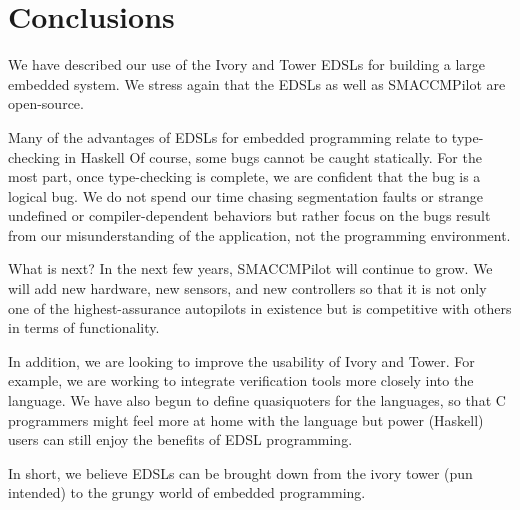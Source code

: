 \section{Conclusions}
\label{sec:conclusions}

We have described our use of the Ivory and Tower EDSLs for building a large
embedded system.  We stress again that the EDSLs as well as SMACCMPilot are
open-source.

Many of the advantages of EDSLs for embedded programming relate to type-checking
in Haskell Of course, some bugs cannot be caught statically.  For the most part,
once type-checking is complete, we are confident that the bug is a logical bug.
We do not spend our time chasing segmentation faults or strange undefined or
compiler-dependent behaviors but rather focus on the bugs result from our
misunderstanding of the application, not the programming environment.

What is next?  In the next few years, SMACCMPilot will continue to grow.  We
will add new hardware, new sensors, and new controllers so that it is not only
one of the highest-assurance autopilots in existence but is competitive with
others in terms of functionality.

In addition, we are looking to improve the usability of Ivory and Tower.  For
example, we are working to integrate verification tools more closely into the
language.  We have also begun to define quasiquoters for the languages, so that
C programmers might feel more at home with the language but power (Haskell)
users can still enjoy the benefits of EDSL programming.

In short, we believe EDSLs can be brought down from the ivory tower (pun
intended) to the grungy world of embedded programming.






